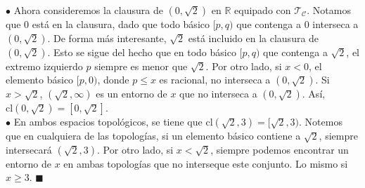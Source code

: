 \documentclass{article}
\begin{document}
$\bullet$ Ahora consideremos la clausura de $(0, \sqrt{2})$ en $\mathbb{R}$ equipado con $\mathcal{T_{C}}$. Notamos que $0$ está en la clausura, dado que todo básico $[p, q)$ que contenga a $0$ interseca a $(0, \sqrt{2})$. De forma más interesante, $\sqrt{2}$ está incluido en la clausura de $(0, \sqrt{2})$. Esto se sigue del hecho que en todo básico $[p, q)$ que contenga a $\sqrt{2}$, el extremo izquierdo $p$ siempre es menor que $\sqrt{2}$. Por otro lado, si $x < 0$, el elemento básico $[p, 0)$, donde $p \leq x$ es racional, no interseca a $(0, \sqrt{2})$. Si $x > \sqrt{2}$, $(\sqrt{2}, \infty)$ es un entorno de $x$ que no interseca a $(0, \sqrt{2})$. Así, $\text{cl}(0, \sqrt{2}) = [0, \sqrt{2}]$. \\

$\bullet$ En ambos espacios topológicos, se tiene que $\text{cl}(\sqrt{2}, 3) = [\sqrt{2}, 3)$. Notemos que en cualquiera de las topologías, si un elemento básico contiene a $\sqrt{2}$, siempre intersecará $(\sqrt{2}, 3)$. Por otro lado, si $x < \sqrt{2}$, siempre podemos encontrar un entorno de $x$ en ambas topologías que no interseque este conjunto. Lo mismo si $x \geq 3$.  \hspace*{\fill} $\blacksquare$
\vspace{0.5cm}
\end{document}

